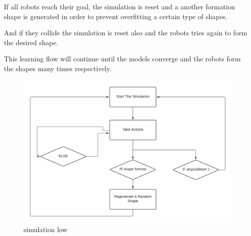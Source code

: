 \documentclass[12pt]{extarticle}
\begin{document}
If all robots reach their goal, the simulation is reset and a another formation shape is generated in order to prevent overfitting a certain type of shapes.

And if they collide the simulation is reset also and the robots tries again to form the desired shape.

This learning flow will continue until the models converge and the robots form the shapes many times respectively.


 \begin{figure}[h]  
\centering
\includegraphics[scale=0.85]{simulation_flow}
\caption[simulation flow]{simulation low}
\end{figure}
\end{document}
